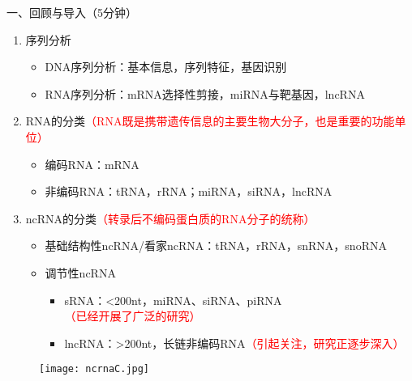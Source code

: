 \documentclass{TIJMUjiaoanLL}
\begin{document}
\noindent
一、回顾与导入（5分钟）
\begin{enumerate}
  \item 序列分析
    \begin{itemize}
      \item DNA序列分析：基本信息，序列特征，基因识别
      \item RNA序列分析：mRNA选择性剪接，miRNA与靶基因，lncRNA
    \end{itemize}
  \item
    RNA的分类\textcolor{red}{（RNA既是携带遗传信息的主要生物大分子，也是重要的功能单位）}
    \begin{itemize}
      \item 编码RNA：mRNA
      \item 非编码RNA：tRNA，rRNA；miRNA，siRNA，lncRNA
    \end{itemize}
  \item ncRNA的分类\textcolor{red}{（转录后不编码蛋白质的RNA分子的统称）}
    \begin{itemize}
      \item 基础结构性ncRNA/看家ncRNA：tRNA，rRNA，snRNA，snoRNA
      \item 调节性ncRNA
      \begin{itemize}
	\item sRNA：\textless 200nt，miRNA、siRNA、piRNA\textcolor{red}{（已经开展了广泛的研究）}
        \item lncRNA：\textgreater 200nt，长链非编码RNA\textcolor{red}{（引起关注，研究正逐步深入）}
      \end{itemize}
    \end{itemize}
\end{enumerate}
\vspace*{-10pt}
\begin{figure}[h]
  \centering
  \texttt{[image: ncrnaC.jpg]}
\end{figure}
\vspace*{-10pt}
\end{document}
